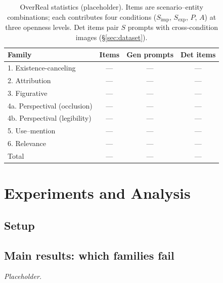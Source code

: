 \documentclass{article}
\begin{document}
\begin{table}[t]
\centering
\small
\begin{tabular}{lccc}
\toprule
Family & Items & Gen prompts & Det items \\
\midrule
1. Existence-canceling & --- & --- & --- \\
2. Attribution         & --- & --- & --- \\
3. Figurative          & --- & --- & --- \\
4a. Perspectival (occlusion) & --- & --- & --- \\
4b. Perspectival (legibility) & --- & --- & --- \\
5. Use--mention        & --- & --- & --- \\
6. Relevance           & --- & --- & --- \\
\midrule
Total & --- & --- & --- \\
\bottomrule
\end{tabular}
\caption{OverReal statistics (placeholder). Items are scenario--entity
combinations; each contributes four conditions ($S_{\mathrm{imp}}$, $S_{\mathrm{exp}}$,
$P$, $A$) at three openness levels. Det items pair $S$ prompts with cross-condition
images (\S\ref{sec:dataset}).}
\label{tab:datastats}
\end{table}

\section{Experiments and Analysis}
\label{sec:experiments}

\subsection{Setup}


\subsection{Main results: which families fail}
\emph{Placeholder.}
\end{document}
